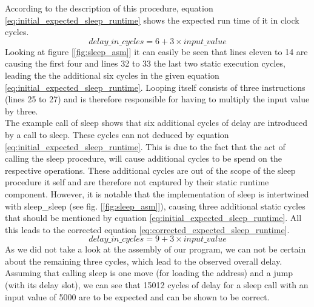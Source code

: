 			According to the description of this procedure, equation \ref{eq:initial_expected_sleep_runtime} shows the expected run time of it in clock cycles. 
			\begin{equation} 
				\label{eq:initial_expected_sleep_runtime}
				delay\_in\_cycles = 6 + 3 \times input\_value
			\end{equation} 
			Looking at figure [\ref{fig:sleep_asm}] it can easily be seen that lines eleven to 14 are causing the first four and lines 32 to 33 the last two static execution cycles, leading the the additional six cycles in the given equation \ref{eq:initial_expected_sleep_runtime}. Looping itself consists of three instructions (lines 25 to 27) and is therefore responsible for having to multiply the input value by three.\\
			The example call of sleep shows that six additional cycles of delay are introduced by a call to sleep. These cycles can not deduced by equation \ref{eq:initial_expected_sleep_runtime}. This is due to the fact that the act of calling the sleep procedure, will cause additional cycles to be spend on the respective operations. These additional cycles are out of the scope of the sleep procedure it self and are therefore not captured by their static runtime component. However, it is notable that the implementation of sleep is intertwined with sleep\_sleep (see fig. [\ref{fig:sleep_asm}]), causing three additional static cycles that should be mentioned by equation \ref{eq:initial_expected_sleep_runtime}. All this leads to the corrected equation \ref{eq:corrected_expected_sleep_runtime}.
			\begin{equation} 
				\label{eq:corrected_expected_sleep_runtime}
				delay\_in\_cycles = 9 + 3 \times input\_value
			\end{equation} 
			As we did not take a look at the assembly of our program, we can not be certain about the remaining three cycles, which lead to the observed overall delay. Assuming that calling sleep is one move (for loading the address) and a jump (with its delay slot), we can see that 15012 cycles of delay for a sleep call with an input value of 5000 are to be expected and can be shown to be correct.

